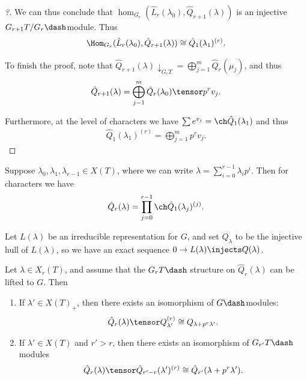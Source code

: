 \begin{proof}[?]
We can thus conclude that
\(\hom_{G_r}( \hat L_r(\lambda_0), \hat Q_{r+1}(\lambda) )\) is an
injective \(G_{r+1}T/G_r\dash\)module. Thus
\begin{align*}  
\Hom_{G_r}(\hat L_r(\lambda_0), \hat Q_{r+1}(\lambda) ) \cong \hat Q_{1}(\lambda_1)^{(r)}
.\end{align*}

To finish the proof, note that
\(\hat{Q}_{r+1}(\lambda) \downarrow_{G_r T} = \bigoplus_{j=1}^m \hat{Q}_r(\mu_j)\),
and thus
\begin{align*}  
\hat{Q}_{r+1}(\lambda) = \bigoplus_{j-1}^m \hat{Q}_r(\lambda_0) \tensor p^r v_j
.\end{align*}

Furthermore, at the level of characters we have
\(\sum e^{v_j} = \ch \hat Q_1(\lambda_1)\) and thus
\begin{align*}  
\hat Q_1(\lambda_1)^{(r)} = \bigoplus_{j=1}^m p^r v_j
.\end{align*}

\end{proof}

\begin{remark}

Suppose \(\lambda_0, \lambda_1, \lambda_{r-1}\in X(T)\), where we can
write \(\lambda = \sum_{i=0}^{r-1} \lambda_i p^i\). Then for characters
we have
\begin{align*}  
\hat Q_{r}(\lambda) = \prod_{j=0}^{r-1} \ch \hat{Q}_1(\lambda_j)^{(j)}
.\end{align*}

\end{remark}

Let \(L(\lambda)\) be an irreducible representation for \(G\), and set
\(Q_\lambda\) to be the injective hull of \(L(\lambda)\), so we have an
exact sequence \(0 \to L(\lambda) \injects Q(\lambda)\).

\begin{proposition}[?]

Let \(\lambda\in X_r(T)\), and assume that the \(G_r T\dash\) structure
on \(\hat Q_r(\lambda)\) can be lifted to \(G\). Then

\begin{enumerate}
\def\labelenumi{\alph{enumi}.}
\item
  If \(\lambda'\in X(T)_+\), then there exists an isomorphism of
  \(G\dash\)modules:
  \begin{align*}  
  \hat{Q}_r(\lambda) \tensor Q_{\lambda'}^{(r)} \cong Q_{\lambda + p^r \lambda'}
  .\end{align*}
\item
  If \(\lambda'\in X(T)\) and \(r'>r\), then there exists an isomorphism
  of \(G_{r'} T\dash\)modules
  \begin{align*}  
  \hat Q_r(\lambda) \tensor \hat Q_{r' - r}(\lambda')^{(r)} \cong \hat Q_{r'}(\lambda + p^r \lambda')
  .\end{align*}
\end{enumerate}

\end{proposition}

